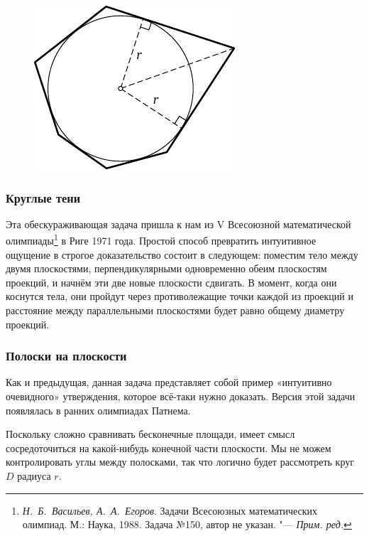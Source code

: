 \documentclass[twoside]{book}
\newcommand\VsMO{\emph{Н.~Б.~Васильев, А.~А.~Егоров}. Задачи Всесоюзных математических олимпиад. М.: Наука, 1988}
\begin{document}
\begin{figure}[!ht]
\centering
\includegraphics[scale=.9]{mp/wink-13}

\vspace{-2\jot}
\end{figure}


\subsubsection*{Круглые тени}%

Эта обескураживающая задача пришла к нам из V Всесоюзной математической олимпиады\footnote{%
\VsMO. Задача №150, автор не указан. "--- \emph{Прим. ред.}} в Риге 1971 года.
Простой способ превратить интуитивное ощущение в строгое доказательство состоит в следующем: поместим тело между двумя плоскостями, перпендикулярными одновременно обеим плоскостям проекций, и начнём  эти две новые плоскости сдвигать.
В  момент, когда они коснутся тела, они пройдут через противолежащие точки каждой из проекций и расстояние между параллельными плоскостями будет равно общему диаметру проекций.
\heart

\subsubsection*{Полоски на плоскости}%

Как и предыдущая, данная задача представляет собой пример «интуитивно очевидного» утверждения, которое всё-таки нужно доказать.
Версия этой задачи появлялась в ранних олимпиадах Патнема.

\medskip

Поскольку сложно сравнивать бесконечные площади, имеет смысл сосредоточиться на какой-нибудь конечной части плоскости.
Мы не можем контролировать углы между полосками, так что логично будет рассмотреть круг $D$ радиуса $r$.
\end{document}
